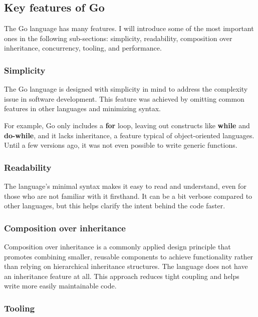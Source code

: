 \subsection{Key features of Go}

The Go language has many features. I will introduce some of the most important ones in the following sub-sections: simplicity, readability, composition over inheritance, concurrency, tooling, and performance. 

\subsubsection{Simplicity}

The Go language is designed with simplicity in mind to address the complexity issue in software development. This feature was achieved by omitting common features in other languages and minimizing syntax. 

For example, Go only includes a \textbf{for} loop, leaving out constructs like \textbf{while} and \textbf{do-while}, and it lacks inheritance, a feature typical of object-oriented languages. Until a few versions ago, it was not even possible to write generic functions.

\subsubsection{Readability}

The language's minimal syntax makes it easy to read and understand, even for those who are not familiar with it firsthand. It can be a bit verbose compared to other languages, but this helps clarify the intent behind the code faster.

\subsubsection{Composition over inheritance \cite{gamma1994design}}

Composition over inheritance is a commonly applied design principle that promotes combining smaller, reusable components to achieve functionality rather than relying on hierarchical inheritance structures. The language does not have an inheritance feature at all. This approach reduces tight coupling and helps write more easily maintainable code.

\subsubsection{Tooling}

